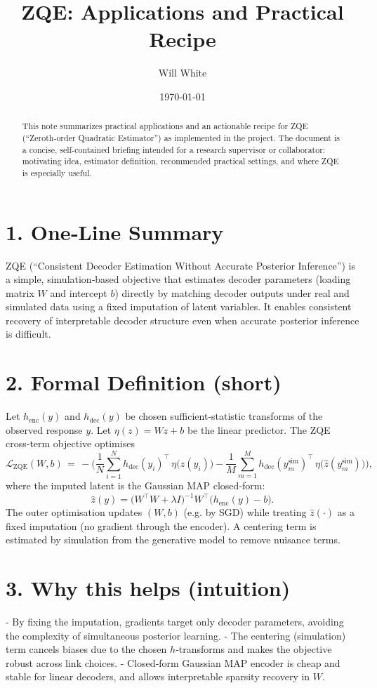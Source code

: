 \documentclass[11pt]{article}
\title{ZQE: Applications and Practical Recipe}
\author{Will White}
\date{\today}
\begin{document}
\maketitle

\begin{abstract}
This note summarizes practical applications and an actionable recipe for ZQE
(``Zeroth‑order Quadratic Estimator'') as implemented in the project. The
document is a concise, self-contained briefing intended for a research
supervisor or collaborator: motivating idea, estimator definition, recommended
practical settings, and where ZQE is especially useful.
\end{abstract}

\section*{1. One‑Line Summary}
ZQE (``Consistent Decoder Estimation Without Accurate Posterior Inference'')
is a simple, simulation‑based objective that estimates decoder parameters
(loading matrix $W$ and intercept $b$) directly by matching decoder outputs
under real and simulated data using a fixed imputation of latent variables.
It enables consistent recovery of interpretable decoder structure even when
accurate posterior inference is difficult.

\section*{2. Formal Definition (short)}
Let $h_{\mathrm{enc}}(y)$ and $h_{\mathrm{dec}}(y)$ be chosen sufficient‑statistic
transforms of the observed response $y$. Let $\eta(z)=W z + b$ be the linear
predictor. The ZQE cross‑term objective optimises
\[
\mathcal{L}_{\mathrm{ZQE}}(W,b) \,=\,-\Biggl(\frac{1}{N}\sum_{i=1}^N
h_{\mathrm{dec}}(y_i)^\top\,\eta\bigl(\hat z(y_i)\bigr) 
- \frac{1}{M}\sum_{m=1}^M h_{\mathrm{dec}}(y^{\mathrm{sim}}_m)^\top\,\eta\bigl(\hat z(y^{\mathrm{sim}}_m)\bigr)\Biggr),
\]
where the imputed latent is the Gaussian MAP closed‑form:
\[
\hat z(y) = \bigl(W^{\top}W + \lambda I\bigr)^{-1} W^{\top}\bigl(h_{\mathrm{enc}}(y) - b\bigr).
\]
The outer optimisation updates $(W,b)$ (e.g. by SGD) while treating $\hat z(\cdot)$
as a fixed imputation (no gradient through the encoder). A centering term is
estimated by simulation from the generative model to remove nuisance terms.

\section*{3. Why this helps (intuition)}
- By fixing the imputation, gradients target only decoder parameters, avoiding
  the complexity of simultaneous posterior learning.
- The centering (simulation) term cancels biases due to the chosen
  $h$‑transforms and makes the objective robust across link choices.
- Closed‑form Gaussian MAP encoder is cheap and stable for linear decoders,
  and allows interpretable sparsity recovery in $W$.
\end{document}
